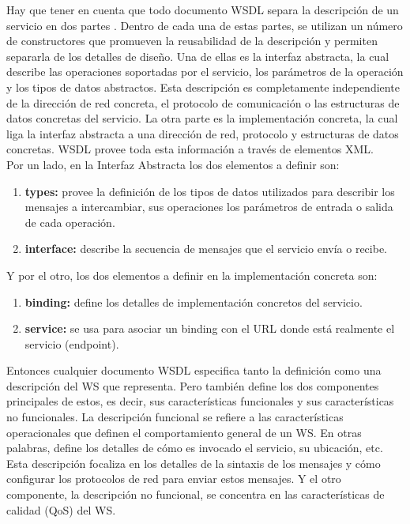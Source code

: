 Hay que tener en cuenta que todo documento WSDL separa la descripción de un servicio en dos partes \cite{WSA}. Dentro de cada una de estas partes, se utilizan un número de constructores que promueven la reusabilidad de la descripción y permiten separarla de los detalles de diseño. Una de ellas es la interfaz abstracta, la cual describe las operaciones soportadas por el servicio, los parámetros de la operación y los tipos de datos abstractos. Esta descripción es completamente independiente de la dirección de red concreta, el protocolo de comunicación o las estructuras de datos concretas del servicio. La otra parte es la implementación concreta, la cual liga la interfaz abstracta a una dirección de red, protocolo y estructuras de datos concretas. WSDL provee toda esta información a través de elementos XML. \\

Por un lado, en la Interfaz Abstracta los dos elementos a definir son:\\

\begin{enumerate}[1.]
	\item \textbf{types:} provee la definición de los tipos de datos utilizados para describir los mensajes a intercambiar, sus operaciones los parámetros de entrada o salida de cada operación.
	
	\item \textbf{interface:} describe la secuencia de mensajes que el servicio envía o recibe.
\end{enumerate}


Y por el otro, los dos elementos a definir en la implementación concreta son:

\begin{enumerate}[1.]
	\item \textbf{binding:} define los detalles de implementación concretos del servicio.
	
	\item \textbf{service:} se usa para asociar un binding con el URL donde está realmente el servicio (endpoint).
\end{enumerate}

Entonces cualquier documento WSDL especifica tanto la definición como una descripción del WS que representa. Pero también define los dos componentes principales de estos, es decir, sus características funcionales y sus características no funcionales.  La descripción funcional se refiere a las características operacionales que definen el comportamiento general de un WS. En otras palabras, define los detalles de cómo es invocado el servicio, su ubicación, etc. Esta descripción focaliza en los detalles de la sintaxis de los mensajes y cómo configurar los protocolos de red para enviar estos mensajes. Y el otro componente, la descripción no funcional, se concentra en las características de calidad (QoS) del WS.


